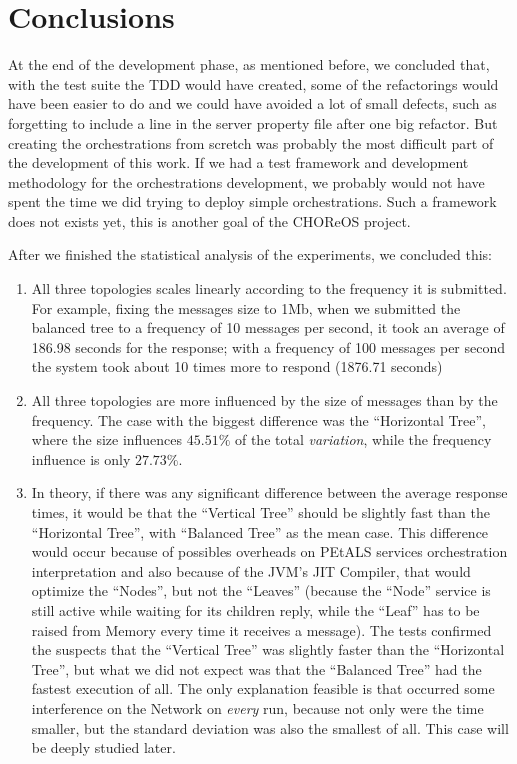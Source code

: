 \section{Conclusions}


At the end of the development phase, as mentioned before, we concluded that, with the test suite the TDD would have created, some of the refactorings would have been easier to do and we could have avoided a lot of small defects, such as forgetting to include a line in the server property file after one big refactor. But creating the orchestrations from scretch was probably the most difficult part of the development of this work. If we had a test framework and development methodology for the orchestrations development, we probably would not have spent the time we did trying to deploy simple orchestrations. Such a framework does not exists yet, this is another goal of the CHOReOS project.




After we finished the statistical analysis of the experiments, we concluded this:
\begin{enumerate}
	\item All three topologies scales linearly according to the frequency it is submitted. For example, fixing the messages size to 1Mb, when we submitted the balanced tree to a frequency of 10 messages per second, it took an average of 186.98 seconds for the response; with a frequency of 100 messages per second the system took about 10 times more to respond (1876.71 seconds)
	\item All three topologies are more influenced by the size of messages than by the frequency. The case with the biggest difference was the ``Horizontal Tree'', where the size influences $45.51\%$ of the total \emph{variation}, while the frequency influence is only $27.73\%$.
	\item In theory, if there was any significant difference between the average response times, it would be that the ``Vertical Tree'' should be slightly fast than the ``Horizontal Tree'', with ``Balanced Tree'' as the mean case. This difference would occur because of possibles overheads on PEtALS services orchestration interpretation and also because of the JVM's JIT Compiler, that would optimize the ``Nodes'', but not the ``Leaves'' (because the ``Node'' service is still active while waiting for its children reply, while the ``Leaf'' has to be raised from Memory every time it receives a message). The tests confirmed the suspects that the ``Vertical Tree'' was slightly faster than the ``Horizontal Tree'', but what we did not expect was that the ``Balanced Tree'' had the fastest execution of all. The only explanation feasible is that occurred some interference on the Network on \emph{every} run, because not only were the time smaller, but the standard deviation was also the smallest of all. This case will be deeply studied later.
\end{enumerate}


